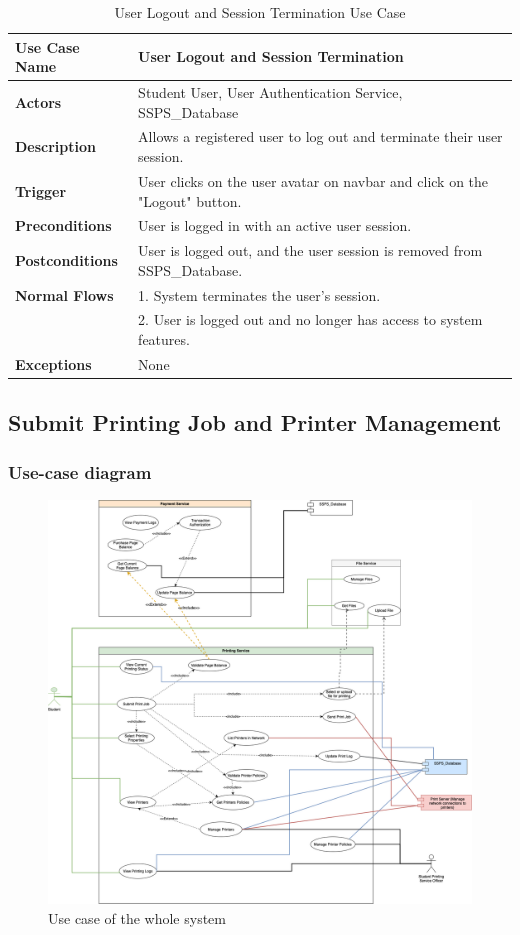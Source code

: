 \begin{table}[H]
\begin{tabular}{|p{5cm}|p{9cm}|}
\hline
\textbf{Use Case Name} & User Logout and Session Termination \\
\hline
\textbf{Actors} & Student User, User Authentication Service, SSPS\_Database \\
\hline
\textbf{Description} & Allows a registered user to log out and terminate their user session. \\
\hline
\textbf{Trigger} & User clicks on the user avatar on navbar and click on the "Logout" button. \\
\hline
\textbf{Preconditions} & User is logged in with an active user session. \\
\hline
\textbf{Postconditions} & User is logged out, and the user session is removed from SSPS\_Database. \\
\hline
\textbf{Normal Flows} & 
1. System terminates the user's session. \\
&2. User is logged out and no longer has access to system features. \\
\hline
\textbf{Exceptions} & None \\
\hline
\end{tabular}
\caption{User Logout and Session Termination Use Case}
\end{table}

\subsection{Submit Printing Job and Printer Management}

\subsubsection{Use-case diagram}

\begin{figure}[H]
  \includegraphics[max width=0.9\linewidth]{chapters/3. use-case-diagram/printing-use-case-diagram.png}
  \caption{Use case of the whole system}%
\end{figure}

